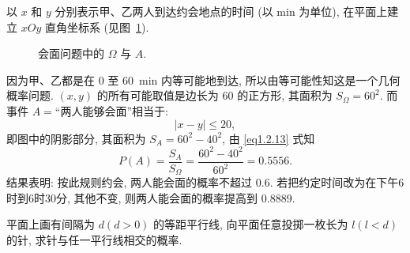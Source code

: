\begin{solution}
    以 $x$ 和 $y$ 分别表示甲、乙两人到达约会地点的时间 (以 \si{\minute} 为单位),
    在平面上建立 $xOy$ 直角坐标系 (见图~\ref{fig1.2.3}).

    \begin{figure}[!ht]
        \centering
        \caption{会面问题中的 $\Omega$ 与 $A$.}
        \label{fig1.2.3}
    \end{figure}

    因为甲、乙都是在 0 至 \SI{60}{\minute} 内等可能地到达,
    所以由等可能性知这是一个几何概率问题.
    $(x, y)$ 的所有可能取值是边长为 60 的正方形,
    其面积为 $S_\Omega = 60^2$.
    而事件 $A =$“两人能够会面”相当于:
    \[
        | x - y | \le 20,
    \]
    即图中的阴影部分,
    其面积为 $S_A = 60^2 - 40^2$,
    由 \eqref{eq1.2.13} 式知
    \[
        P (A) = \frac{S_A}{S_\Omega} = \frac{60^2 - 40^2}{60^2} = 0.5556.
    \]
    结果表明:
    按此规则约会,
    两人能会面的概率不超过 0.6.
    若把约定时间改为在下午6时到6时30分,
    其他不变,
    则两人能会面的概率提高到 \num{0.8889}.
\end{solution}

\begin{example}[蒲丰投针问题]
    平面上画有间隔为 $d (d > 0)$ 的等距平行线,
    向平面任意投掷一枚长为 $l (l<d)$ 的针,
    求针与任一平行线相交的概率.
\end{example}

